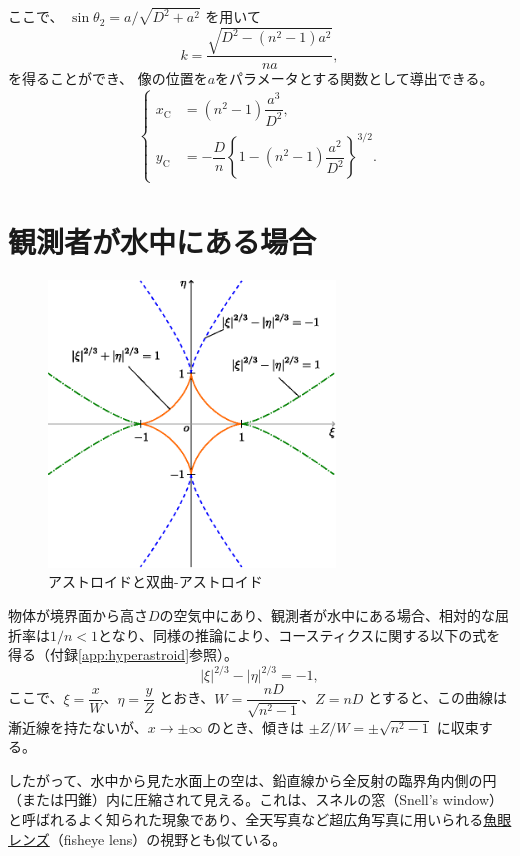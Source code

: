 \documentclass[twocolumn]{article}
\begin{document}
ここで、
$\sin\theta_2 = {a}/{\sqrt{D^2+a^2}}$
を用いて
$$k = \dfrac{\sqrt{D^2-(n^2-1)a^2}}{na},$$
を得ることができ、
像の位置を$a$をパラメータとする関数として導出できる。
$$ \left\{ 
\begin{aligned}
	x_{\mathrm{C}}^{} &= (n^2-1)\dfrac{a^3}{D^2},\\
	y_{\mathrm{C}}^{}
	&= -\dfrac{D}{n}\left\{ 1-(n^2-1)\dfrac{a^2}{D^2} \right\}^{3/2}.
\end{aligned}
\right.$$
	
\section{観測者が水中にある場合}

\begin{figure}
	\centering
	\includegraphics[width=3in]{figs/g254.eps}
	\caption{アストロイドと双曲-アストロイド}
	\label{fig:hyperastroid}
\end{figure}

物体が境界面から高さ$D$の空気中にあり、観測者が水中にある場合、相対的な屈折率は$1/n < 1$となり、同様の推論により、コースティクスに関する以下の式を得る（付録\ref{app:hyperastroid}参照）。
$$ \left| \xi \right|^{2/3} - \left| \eta \right|^{2/3} = -1, $$
ここで、$\xi = \dfrac{x}{W} $、$\eta = \dfrac{y}{Z}$ とおき、$W = \dfrac{nD}{\sqrt{n^2-1}}$、$Z = nD$ とすると、この曲線は漸近線を持たないが、$x \to \pm \infty$ のとき、傾きは $\pm Z/W = \pm \sqrt{n^2-1}$ に収束する。

したがって、水中から見た水面上の空は、鉛直線から全反射の臨界角内側の円（または円錐）内に圧縮されて見える。これは、スネルの窓（Snell's window）と呼ばれるよく知られた現象であり、全天写真など超広角写真に用いられる\href{https://ja.wikipedia.org/wiki/%E9%AD%9A%E7%9C%BC%E3%83%AC%E3%83%B3%E3%82%BA}{魚眼レンズ}（fisheye lens）の視野とも似ている。
\end{document}
